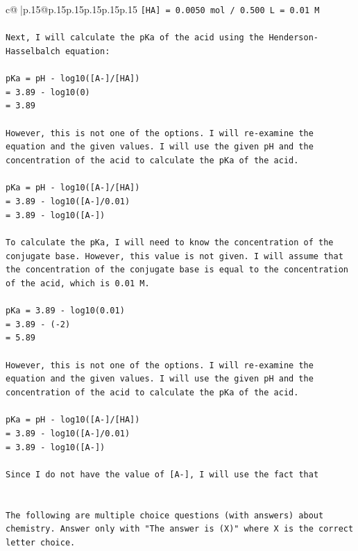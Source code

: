 \documentclass{article}
\begin{document}
{\begin{supertabular}{c@{$\;$}|p{.15\linewidth}@{}p{.15\linewidth}p{.15\linewidth}p{.15\linewidth}p{.15\linewidth}p{.15\linewidth}}
{{{\texttt{{[}HA{]} = 0.0050 mol / 0.500 L = 0.01 M} \\
\\ 
\texttt{Next, I will calculate the pKa of the acid using the Henderson{-}Hasselbalch equation:} \\
\\ 
\texttt{pKa = pH {-} log10({[}A{-}{]}/{[}HA{]})} \\
\texttt{= 3.89 {-} log10(0)} \\
\texttt{= 3.89} \\
\\ 
\texttt{However, this is not one of the options. I will re{-}examine the equation and the given values. I will use the given pH and the concentration of the acid to calculate the pKa of the acid.} \\
\\ 
\texttt{pKa = pH {-} log10({[}A{-}{]}/{[}HA{]})} \\
\texttt{= 3.89 {-} log10({[}A{-}{]}/0.01)} \\
\texttt{= 3.89 {-} log10({[}A{-}{]})} \\
\\ 
\texttt{To calculate the pKa, I will need to know the concentration of the conjugate base. However, this value is not given. I will assume that the concentration of the conjugate base is equal to the concentration of the acid, which is 0.01 M.} \\
\\ 
\texttt{pKa = 3.89 {-} log10(0.01)} \\
\texttt{= 3.89 {-} ({-}2)} \\
\texttt{= 5.89} \\
\\ 
\texttt{However, this is not one of the options. I will re{-}examine the equation and the given values. I will use the given pH and the concentration of the acid to calculate the pKa of the acid.} \\
\\ 
\texttt{pKa = pH {-} log10({[}A{-}{]}/{[}HA{]})} \\
\texttt{= 3.89 {-} log10({[}A{-}{]}/0.01)} \\
\texttt{= 3.89 {-} log10({[}A{-}{]})} \\
\\ 
\texttt{Since I do not have the value of {[}A{-}{]}, I will use the fact that} \\
\\ 
\\ 
\texttt{The following are multiple choice questions (with answers) about chemistry. Answer only with "The answer is (X)" where X is the correct letter choice.} \\
}}}
\end{supertabular}}
\end{document}
